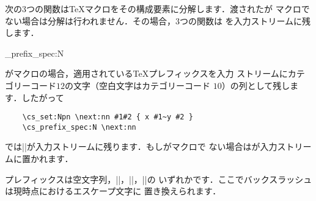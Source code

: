 \documentclass[uplatex,dvipdfmx,full,kernel]{wtpl3doc}
\begin{document}
\begin{documentation}
次の3つの関数は\TeX マクロをその構成要素に分解します．渡されたが
マクロでない場合は分解は行われません．その場合，3つの関数は%
を入力ストリームに残します．

\begin{function}[EXP, added = 2019-02-27]{\cs_prefix_spec:N}
  \begin{syntax}
     
  \end{syntax}
  がマクロの場合，適用されている\TeX プレフィックスを入力
  ストリームにカテゴリーコード$12$の文字（空白文字はカテゴリーコード
  $10$）の列として残します．したがって
  \begin{verbatim}
    \cs_set:Npn \next:nn #1#2 { x #1~y #2 }
    \cs_prefix_spec:N \next:nn
  \end{verbatim}
  では|\long|が入力ストリームに残ります．もしがマクロで
  ない場合はが入力ストリームに置かれます．
  \begin{texnote}
    プレフィックスは空文字列，|\long|，|\protected|，|\protected\long|の
    いずれかです．ここでバックスラッシュは現時点におけるエスケープ文字に
    置き換えられます．
  \end{texnote}
\end{function}


\end{documentation}
\end{document}
